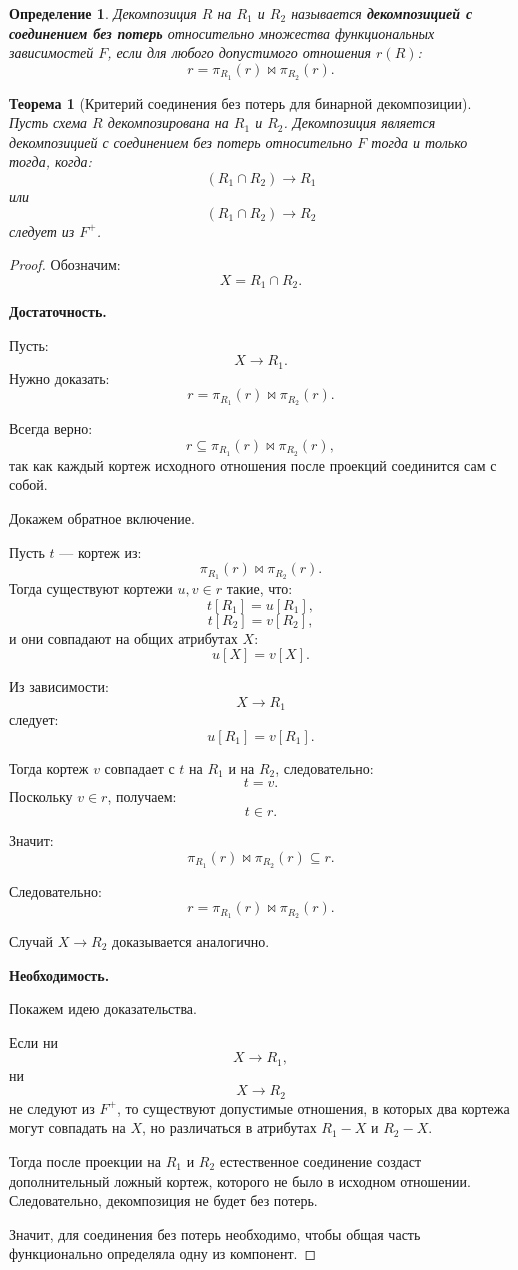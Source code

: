 \documentclass[12pt,a4paper]{article}
\newtheorem{definition}{Определение}[section]
\newtheorem{theorem}{Теорема}[section]
\theoremstyle{remark}
\begin{document}
\begin{definition}
Декомпозиция $R$ на $R_1$ и $R_2$ называется \textbf{декомпозицией с соединением без потерь} относительно множества функциональных зависимостей $F$, если для любого допустимого отношения $r(R)$:
\[
r = \pi_{R_1}(r) \bowtie \pi_{R_2}(r).
\]
\end{definition}

\begin{theorem}[Критерий соединения без потерь для бинарной декомпозиции]
Пусть схема $R$ декомпозирована на $R_1$ и $R_2$.
Декомпозиция является декомпозицией с соединением без потерь относительно $F$ тогда и только тогда, когда:
\[
(R_1 \cap R_2) \to R_1
\]
или
\[
(R_1 \cap R_2) \to R_2
\]
следует из $F^+$.
\end{theorem}

\begin{proof}
Обозначим:
\[
X = R_1 \cap R_2.
\]

\textbf{Достаточность.}

Пусть:
\[
X \to R_1.
\]
Нужно доказать:
\[
r = \pi_{R_1}(r) \bowtie \pi_{R_2}(r).
\]

Всегда верно:
\[
r \subseteq \pi_{R_1}(r) \bowtie \pi_{R_2}(r),
\]
так как каждый кортеж исходного отношения после проекций соединится сам с собой.

Докажем обратное включение.

Пусть $t$ --- кортеж из:
\[
\pi_{R_1}(r) \bowtie \pi_{R_2}(r).
\]
Тогда существуют кортежи $u,v \in r$ такие, что:
\[
t[R_1] = u[R_1],
\]
\[
t[R_2] = v[R_2],
\]
и они совпадают на общих атрибутах $X$:
\[
u[X] = v[X].
\]

Из зависимости:
\[
X \to R_1
\]
следует:
\[
u[R_1] = v[R_1].
\]

Тогда кортеж $v$ совпадает с $t$ на $R_1$ и на $R_2$, следовательно:
\[
t = v.
\]
Поскольку $v \in r$, получаем:
\[
t \in r.
\]

Значит:
\[
\pi_{R_1}(r) \bowtie \pi_{R_2}(r) \subseteq r.
\]

Следовательно:
\[
r = \pi_{R_1}(r) \bowtie \pi_{R_2}(r).
\]

Случай $X \to R_2$ доказывается аналогично.

\textbf{Необходимость.}

Покажем идею доказательства.

Если ни
\[
X \to R_1,
\]
ни
\[
X \to R_2
\]
не следуют из $F^+$, то существуют допустимые отношения, в которых два кортежа могут совпадать на $X$, но различаться в атрибутах $R_1-X$ и $R_2-X$.

Тогда после проекции на $R_1$ и $R_2$ естественное соединение создаст дополнительный ложный кортеж, которого не было в исходном отношении. Следовательно, декомпозиция не будет без потерь.

Значит, для соединения без потерь необходимо, чтобы общая часть функционально определяла одну из компонент.
\end{proof}
\end{document}
